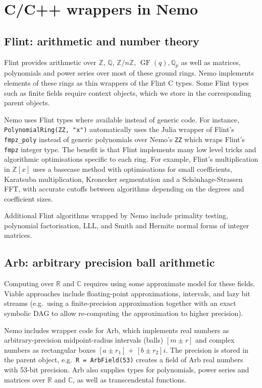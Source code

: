 \documentclass{sig-alternate-05-2015}
\begin{document}
\section{C/C++ wrappers in Nemo}

\subsection{Flint: arithmetic and number theory}

Flint provides arithmetic over
$\mathbb{Z}$, $\mathbb{Q}$, $\mathbb{Z}/n\mathbb{Z}$,
$\operatorname{GF}(q), \mathbb{Q}_p$
as well as matrices, polynomials and power series over most
of these ground rings.
Nemo implements elements of these rings as thin wrappers of the
Flint C types.
Some Flint types such as finite fields
require context objects, which we
store in the corresponding parent objects.

Nemo uses Flint types where available instead of generic code.
For instance, \texttt{PolynomialRing(ZZ, "x")} automatically uses
the Julia wrapper of Flint's \texttt{fmpz\_poly} instead of generic
polynomials over Nemo's \texttt{ZZ} which wraps Flint's \texttt{fmpz}
integer type.
The benefit is that
Flint implements many low level tricks and algorithmic optimisations
specific to each ring. For example, Flint's multiplication in $\mathbb{Z}[x]$
uses a basecase method with optimisations for small coefficients,
Karatsuba multiplication, Kronecker segmentation and
a Sch\"{o}nhage-Strassen FFT, with accurate cutoffs
between algorithms depending on the degrees and coefficient sizes.

Additional Flint algorithms wrapped by Nemo include
primality testing, polynomial factorisation, LLL, and Smith and Hermite
normal forms of integer matrices.

\subsection{Arb: arbitrary precision ball arithmetic}

Computing over $\mathbb{R}$ and $\mathbb{C}$ requires
using some approximate model for these fields.
Viable approaches include floating-point approximations,
intervals, and lazy bit streams (e.g.\ using a finite-precision
approximation together with an exact symbolic DAG
to allow re-computing the approximation to higher precision).

Nemo includes wrapper code for Arb, which implements real numbers as
arbitrary-precision midpoint-radius intervals (balls) $[m \pm r]$
and complex numbers as rectangular boxes $[a \pm r_1]$ + $[b \pm r_2] i$.
The precision is stored in the parent object, e.g.\ \texttt{R = ArbField(53)}
creates a field of Arb real numbers with 53-bit precision.
Arb also supplies types for polynomials, power series and matrices
over $\mathbb{R}$ and $\mathbb{C}$, as well as transcendental functions.
\end{document}
